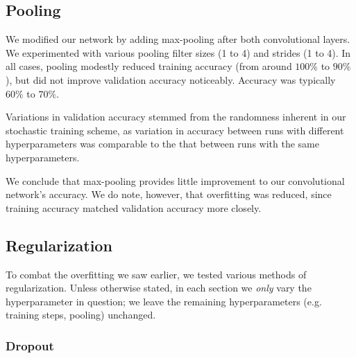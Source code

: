 \documentclass{article}
\begin{document}
\begin{multicols}{2}
\subsection{Pooling}

We modified our network by adding max-pooling
after both convolutional layers.
We experimented with various pooling filter sizes (1 to 4)
and strides (1 to 4).
In all cases,
pooling modestly reduced training accuracy
(from around $100\%$ to $90\%$),
but did not improve validation accuracy noticeably.
Accuracy was typically $60\%$ to $70\%$.

Variations in validation accuracy
stemmed from the randomness inherent in our stochastic training scheme,
as variation in accuracy between runs with different hyperparameters
was comparable to the that between runs with the same hyperparameters.

We conclude that max-pooling provides little improvement
to our convolutional network's accuracy.
We do note, however, that overfitting was reduced,
since training accuracy matched validation accuracy more closely.

\subsection{Regularization}

To combat the overfitting we saw earlier,
we tested various methods of regularization.
Unless otherwise stated,
in each section we \emph{only} vary the hyperparameter in question;
we leave the remaining hyperparameters (e.g. training steps, pooling) unchanged.


\subsubsection{Dropout}



\end{multicols}
\end{document}
